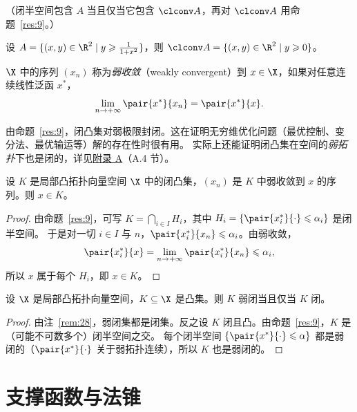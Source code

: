 （闭半空间包含 $A$ 当且仅当它包含 $\clconv A$，再对 $\clconv A$ 用命题~\ref{res:9}。）

\begin{example}
\label{exa:2}
设 $A=\{(x,y)\in\R^2\mid y\geqslant\frac1{1+x^2}\}$，则 $\clconv A=\{(x,y)\in\R^2\mid y\geqslant0\}$。
\end{example}

\begin{definition}[弱收敛]
\label{def:8}
$\X$ 中的序列 $(x_n)$ 称为\emph{弱收敛}（weakly convergent）到 $x\in\X$，如果对任意连续线性泛函 $x^*$，
\[
  \lim_{n\to+\infty}\pair{x^*}{x_n}=\pair{x^*}{x}.
\]
\end{definition}

由命题~\ref{res:9}，闭凸集对弱极限封闭。这在证明无穷维优化问题（最优控制、变分法、最优输运等）解的存在性时很有用。
实际上还能证明闭凸集在空间的\emph{弱拓扑}下也是闭的，详见\hyperref[ch:appA]{附录 A}（A.4 节）。

\begin{corollary}
\label{res:11}
设 $K$ 是局部凸拓扑向量空间 $\X$ 中的闭凸集，$(x_n)$ 是 $K$ 中弱收敛到 $x$ 的序列。则 $x\in K$。
\end{corollary}

\begin{proof}
由命题~\ref{res:9}，可写 $K=\bigcap_{i\in I}H_i$，其中 $H_i=\{\pair{x_i^*}{\cdot}\leqslant\alpha_i\}$ 是闭半空间。
于是对一切 $i\in I$ 与 $n$，$\pair{x_i^*}{x_n}\leqslant\alpha_i$。由弱收敛，
\[
  \pair{x_i^*}{x}=\lim_{n\to+\infty}\pair{x_i^*}{x_n}\leqslant\alpha_i ,
\]
所以 $x$ 属于每个 $H_i$，即 $x\in K$。
\end{proof}

\begin{proposition}
\label{res:12}
设 $\X$ 是局部凸拓扑向量空间，$K\subseteq\X$ 是凸集。则 $K$ 弱闭当且仅当 $K$ 闭。
\end{proposition}

\begin{proof}
由注~\ref{rem:28}，弱闭集都是闭集。反之设 $K$ 闭且凸。由命题~\ref{res:9}，$K$ 是（可能不可数多个）闭半空间之交。
每个闭半空间 $\{\pair{x^*}{\cdot}\leqslant\alpha\}$ 都是弱闭的（$\pair{x^*}{\cdot}$ 关于弱拓扑连续），所以 $K$ 也是弱闭的。
\end{proof}

\section{支撑函数与法锥}


